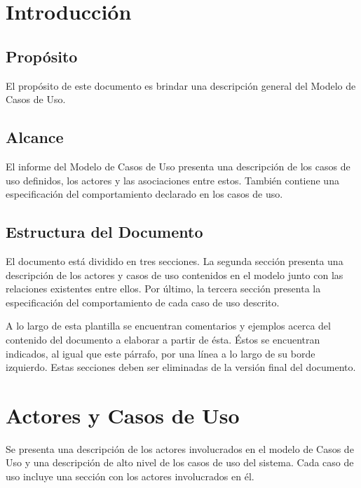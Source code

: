 \documentclass[10pt,spanish]{article}
\numberwithin{figure}{section} %
\begin{document}
\newpage
\tableofcontents

\newpage
\section{Introducción}
\subsection{Propósito}
El propósito de este documento es brindar una descripción general del Modelo de Casos de Uso.

\subsection{Alcance}
El informe del Modelo de Casos de Uso presenta una descripción de los casos de uso definidos, los actores y las asociaciones entre estos. También contiene una especificación del comportamiento declarado en los casos de uso.

\subsection{Estructura del Documento}
El documento está dividido en tres secciones. La segunda sección presenta una descripción de los actores y casos de uso contenidos en el modelo junto con las relaciones existentes entre ellos. Por último, la tercera sección presenta la especificación del comportamiento de cada caso de uso descrito.

\begin{siderules}
A lo largo de esta plantilla se encuentran comentarios y ejemplos acerca del contenido del documento a elaborar a partir de ésta. Éstos se encuentran indicados, al igual que este párrafo, por una línea a lo largo de su borde izquierdo. Estas secciones deben ser eliminadas de la versión final del documento.
\end{siderules}

\section{Actores y Casos de Uso}
Se presenta una descripción de los actores involucrados en el modelo de Casos de Uso y una descripción de alto nivel de los casos de uso del sistema. Cada caso de uso incluye una sección con los actores involucrados en él.
\end{document}
